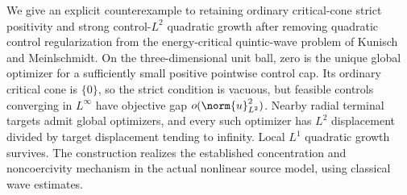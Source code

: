 We give an explicit counterexample to retaining ordinary critical-cone
strict positivity and strong control-$L^2$ quadratic growth after removing
quadratic control regularization from the energy-critical quintic-wave
problem of Kunisch and Meinlschmidt. On the three-dimensional unit ball,
zero is the unique global optimizer for a sufficiently small positive
pointwise control cap. Its ordinary critical cone is $\{0\}$, so the strict
condition is vacuous, but feasible controls converging in $L^\infty$ have
objective gap $o(\norm{u}_{L^2}^2)$. Nearby radial terminal targets admit
global optimizers, and every such optimizer has $L^2$ displacement divided
by target displacement tending to infinity. Local $L^1$ quadratic growth
survives. The construction realizes the established concentration and
noncoercivity mechanism in the actual nonlinear source model, using
classical wave estimates.
